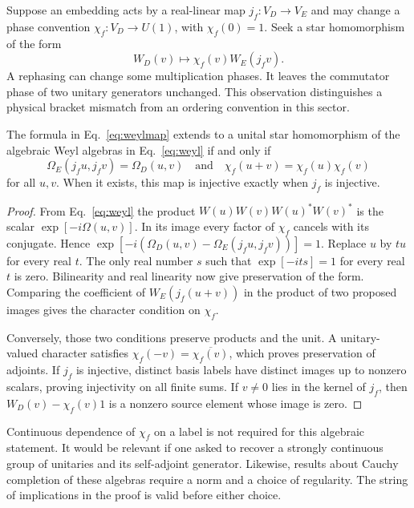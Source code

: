 \documentclass[11pt,letterpaper]{article}
\begin{document}
Suppose an embedding acts by a real-linear map $j_f:V_D\to V_E$ and may change a phase convention $\chi_f:V_D\to U(1)$, with $\chi_f(0)=1$. Seek a star homomorphism of the form
\begin{equation}
 W_D(v)\longmapsto \chi_f(v)W_E(j_fv).                  \label{eq:weylmap}
\end{equation}
A rephasing can change some multiplication phases. It leaves the commutator phase of two unitary generators unchanged. This observation distinguishes a physical bracket mismatch from an ordering convention in this sector.

\begin{proposition}\label{prop:weyl}
The formula in Eq.~\eqref{eq:weylmap} extends to a unital star homomorphism of the algebraic Weyl algebras in Eq.~\eqref{eq:weyl} if and only if
\[
 \Omega_E(j_fu,j_fv)=\Omega_D(u,v)
 \quad\text{and}\quad
 \chi_f(u+v)=\chi_f(u)\chi_f(v)
\]
for all $u,v$. When it exists, this map is injective exactly when $j_f$ is injective.
\end{proposition}
\begin{proof}
From Eq.~\eqref{eq:weyl} the product $W(u)W(v)W(u)^*W(v)^*$ is the scalar $\exp[-i\Omega(u,v)]$. In its image every factor of $\chi_f$ cancels with its conjugate. Hence $\exp[-i(\Omega_D(u,v)-\Omega_E(j_fu,j_fv))]=1$. Replace $u$ by $tu$ for every real $t$. The only real number $s$ such that $\exp[-its]=1$ for every real $t$ is zero. Bilinearity and real linearity now give preservation of the form. Comparing the coefficient of $W_E(j_f(u+v))$ in the product of two proposed images gives the character condition on $\chi_f$.

Conversely, those two conditions preserve products and the unit. A unitary-valued character satisfies $\chi_f(-v)=\overline{\chi_f(v)}$, which proves preservation of adjoints. If $j_f$ is injective, distinct basis labels have distinct images up to nonzero scalars, proving injectivity on all finite sums. If $v\ne0$ lies in the kernel of $j_f$, then $W_D(v)-\chi_f(v)1$ is a nonzero source element whose image is zero.
\end{proof}

Continuous dependence of $\chi_f$ on a label is not required for this algebraic statement. It would be relevant if one asked to recover a strongly continuous group of unitaries and its self-adjoint generator. Likewise, results about Cauchy completion of these algebras require a norm and a choice of regularity. The string of implications in the proof is valid before either choice.
\end{document}
